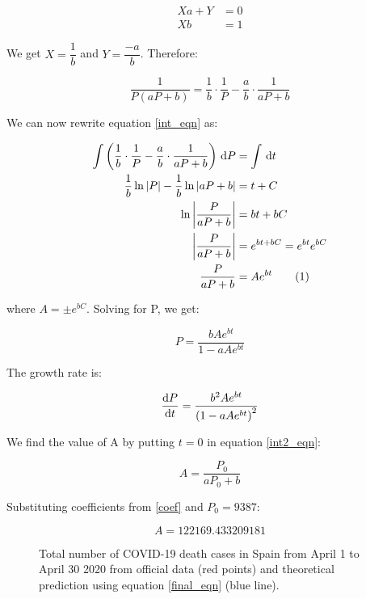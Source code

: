 \documentclass[12pt]{scrartcl}
\newcommand{\abs}[1]{\left | #1 \right |}
\newcommand\numberthis{\addtocounter{equation}{1}\tag{\theequation}}
\begin{document}
\begin{align*}
Xa + Y &= 0 \\
Xb &= 1
\end{align*}

We get $X = \dfrac{1}{b}$ and $Y = \dfrac{-a}{b}$. Therefore:

\begin{equation*}
\frac{1}{P(aP + b)} = \frac{1}{b} \cdot \frac{1}{P} - \frac{a}{b} \cdot \frac{1}{aP + b}
\end{equation*}

We can now rewrite equation \ref{int_eqn} as:

\begin{align*}
\int \left ( \frac{1}{b} \cdot \frac{1}{P} - \frac{a}{b} \cdot \frac{1}{aP + b} \right ) \dl{P} &= \int \dl{t} \\
\frac{1}{b} \ln \abs{P} - \frac{1}{b} \ln \abs{aP + b} &= t + C \\
\ln \abs{\frac{P}{aP + b}} &= bt + bC \\
\abs{\frac{P}{aP + b}} &= e^{bt + bC} = e^{bt}e^{bC} \\
\frac{P}{aP + b} &= Ae^{bt} \numberthis \label{int2_eqn}
\end{align*}

where $A = \pm e^{bC}$. Solving for P, we get:

\begin{equation} \label{final_eqn}
P = \frac{bAe^{bt}}{1 - aAe^{bt}}
\end{equation}

The growth rate is:

\begin{equation} \label{final_rate_eqn}
\diff{P}{t} = \frac{b^2Ae^{bt}}{\left ( 1 - aAe^{bt} \right ) ^2}
\end{equation}

We find the value of A by putting $t = 0$ in equation \ref{int2_eqn}:

\begin{equation*}
A = \frac{P_0}{aP_0 + b}
\end{equation*}

Substituting coefficients from \ref{coef} and $P_0 = 9387$:

\begin{equation*}
A = 122169.433209181
\end{equation*}

\begin{figure}[H]
  \centering
  
  \caption{Total number of COVID-19 death cases in Spain from April 1 to
  April 30 2020 from official data (red points) and theoretical prediction
  using equation \ref{final_eqn} (blue line).}
  \label{prediction}
\end{figure}
\end{document}
